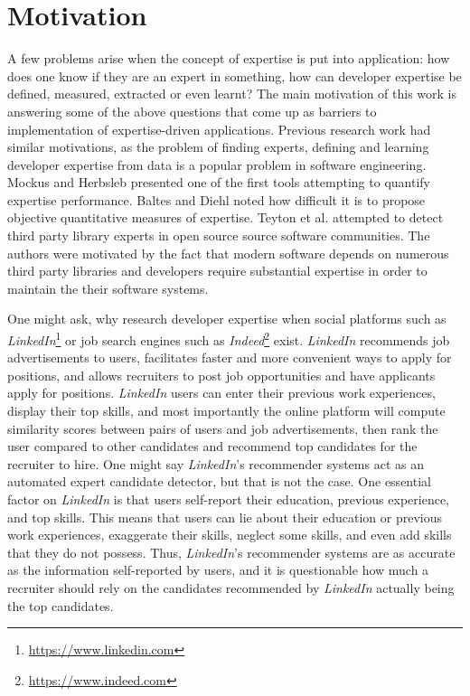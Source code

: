     \section{Motivation\label{sec:motivation}}
        A few problems arise when the concept of expertise is put into application: how does one know if they are an expert in something, how can developer expertise be defined, measured, extracted or even learnt? The main motivation of this work is answering some of the above questions that come up as barriers to implementation of expertise-driven applications. Previous research work had similar motivations, as the problem of finding experts, defining and learning developer expertise from data is a popular problem in software engineering. Mockus and Herbsleb \cite{mockus2002expertise} presented one of the first tools attempting to quantify expertise performance. Baltes and Diehl \cite{baltes2018towards} noted how difficult it is to propose objective quantitative measures of expertise. Teyton et al. \cite{teyton2013find} attempted to detect third party library experts in open source source software communities. The authors were motivated by the fact that modern software depends on numerous third party libraries and developers require substantial expertise in order to maintain the their software systems.
        
        \label{LinkedIn_flaws}One might ask, why research developer expertise when social platforms such as \emph{LinkedIn}\footnote{\url{https://www.linkedin.com}} or job search engines such as \emph{Indeed}\footnote{\url{https://www.indeed.com}} exist. \emph{LinkedIn} recommends job advertisements to users, facilitates faster and more convenient ways to apply for positions, and allows recruiters to post job opportunities and have applicants apply for positions. \emph{LinkedIn} users can enter their previous work experiences, display their top skills, and most importantly the online platform will compute similarity scores between pairs of users and job advertisements, then rank the user compared to other candidates and recommend top candidates for the recruiter to hire. One might say \emph{LinkedIn}'s recommender systems act as an automated expert candidate detector, but that is not the case. One essential factor on \emph{LinkedIn} is that users self-report their education, previous experience, and top skills. This means that users can lie about their education or previous work experiences, exaggerate their skills, neglect some skills, and even add skills that they do not possess. Thus, \emph{LinkedIn}'s recommender systems are as accurate as the information self-reported by users, and it is questionable how much a recruiter should rely on the candidates recommended by \emph{LinkedIn} actually being the top candidates.
        
